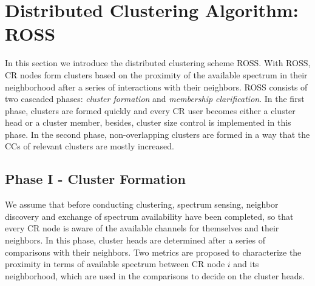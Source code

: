 \documentclass[times]{ettauth}
\newcommand{\ie}{i.e., }
\theoremstyle{mytheoremstyle}
\theoremstyle{mytheoremstyle}
\theoremstyle{mytheoremstyle}
\newcommand{\bigO}{\ensuremath{\mathcal{O}}}%
\begin{document}


\section{Distributed Clustering Algorithm: ROSS}
\label{ross}

In this section we introduce the distributed clustering scheme ROSS.
With ROSS, CR nodes form clusters based on the proximity of the available spectrum in their neighborhood after a series of interactions with their neighbors.
ROSS consists of two cascaded phases: \textit{cluster formation} and \textit{membership clarification}.
In the first phase, clusters are formed quickly and every CR user becomes either a cluster head or a cluster member, besides, cluster size control is implemented in this phase.
In the second phase, non-overlapping clusters are formed in a way that the CCs of relevant clusters are mostly increased.

	

\subsection{Phase I - Cluster Formation}
\label{phaseI}
We assume that before conducting clustering, spectrum sensing, neighbor discovery and exchange of spectrum availability have been completed, so that every CR node is aware of the available channels for themselves and their neighbors.
In this phase, cluster heads are determined after a series of comparisons with their neighbors. 
Two metrics are proposed to characterize the proximity in terms of available spectrum between CR node $i$ and its neighborhood, which are used in the comparisons to decide on the cluster heads.
\end{document}
